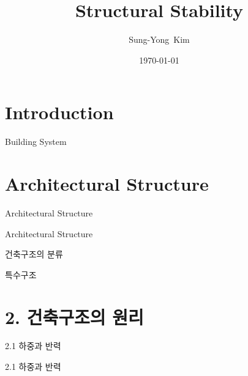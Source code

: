 \documentclass[9pt]{beamer}
\title{Structural Stability}
\author{Sung-Yong~Kim\inst{1}}
\institute[Changwon National University] %
{
	\inst{1}%
	Associate Professor, School of Architecture\\
	Changwon National University}
\date{\today}
\begin{document}
\begin{frame}
	\titlepage
\end{frame}

\section{Introduction}

\begin{frame}{Building System}

\end{frame}

\section{Architectural Structure}

\begin{frame}{Architectural Structure}

\end{frame}

\begin{frame}{Architectural Structure}

\end{frame}

\begin{frame}{건축구조의 분류}

\end{frame}

\begin{frame}{특수구조}

\end{frame}

\section{2. 건축구조의 원리}	
\begin{frame}{2.1 하중과 반력}

\end{frame}

\begin{frame}{2.1 하중과 반력}

\end{frame}
\end{document}

